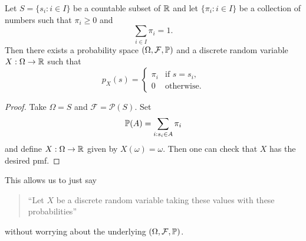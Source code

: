 \begin{theorem}
  Let $S = \{s_i : i \in I\}$ be a countable
  subset of $\mathbb{R}$ and let
  $\{\pi_i : i \in I\}$ be a collection of
  numbers such that $\pi_i \ge 0$ and
  \[
    \sum_{i \in I} \pi_i = 1.
  \]
  Then there exists a probability space
  $(\Omega, \mathcal{F}, \mathbb{P})$ and a discrete
  random variable $X : \Omega \to \mathbb{R}$ such that
  \[
    p_X(s) =
    \begin{cases}
      \pi_i & \text{if } s = s_i, \\
      0 & \text{otherwise}.
    \end{cases}
  \]
\end{theorem}

\begin{proof}
  Take $\Omega = S$ and
  $\mathcal{F} = \mathcal{P}(S)$. Set
  \[\mathbb{P}(A) = \sum_{i : s_i \in A} \pi_i\]
  and define $X : \Omega \to \mathbb{R}$ given by
  $X(\omega) = \omega$. Then one can check
  that $X$ has the desired pmf.
\end{proof}

\begin{remark}
  This allows us to just say
  \begin{quote}
    ``Let $X$ be a discrete random variable taking
    these values with these probabilities''
  \end{quote}
  without worrying about the underlying
  $(\Omega, \mathcal{F}, \mathbb{P})$.
\end{remark}

